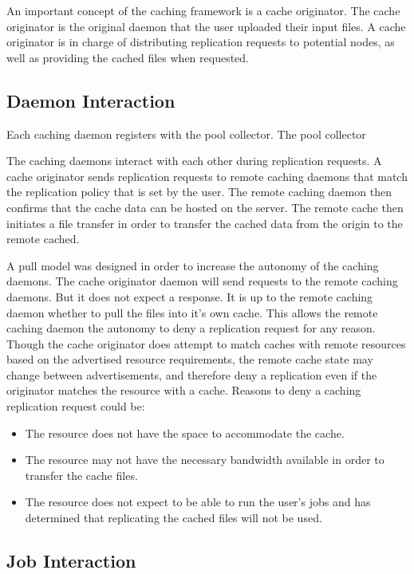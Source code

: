 An important concept of the caching framework is a cache originator.  The cache originator is the original daemon that the user uploaded their input files.  A cache originator is in charge of distributing replication requests to potential nodes, as well as providing the cached files when requested.

\subsection{Daemon Interaction}

Each caching daemon registers with the pool collector.  The pool collector 

The caching daemons interact with each other during replication requests.  A cache originator sends replication requests to remote caching daemons that match the replication policy that is set by the user.  The remote caching daemon then confirms that the cache data can be hosted on the server.  The remote cache then initiates a file transfer in order to transfer the cached data from the origin to the remote cached.

A pull model was designed in order to increase the autonomy of the caching daemons.  The cache originator daemon will send requests to the remote caching daemons.  But it does not expect a response.  It is up to the remote caching daemon whether to pull the files into it's own cache.  This allows the remote caching daemon the autonomy to deny a replication request for any reason.  Though the cache originator does attempt to match caches with remote resources based on the advertised resource requirements, the remote cache state may change between advertisements, and therefore deny a replication even if the originator matches the resource with a cache.  Reasons to deny a caching replication request could be:

\begin{itemize}
\item The resource does not have the space to accommodate the cache.
\item The resource may not have the necessary bandwidth available in order to transfer the cache files.
\item The resource does not expect to be able to run the user's jobs and has determined that replicating the cached files will not be used.
\end{itemize}



\subsection{Job Interaction}





